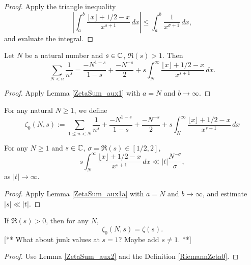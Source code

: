\begin{proof}
Apply the triangle inequality
$$
\left|\int_a^b \frac{\lfloor x\rfloor + 1/2 - x}{x^{s+1}} \, dx\right|
\le \int_a^b \frac{1}{x^{\sigma+1}} \, dx,
$$
and evaluate the integral.
\end{proof}


\begin{lemma}\label{ZetaSum_aux2}\leanok
  Let $N$ be a natural number and $s\in \C$, $\Re(s)>1$.
  Then
  \[
  \sum_{N < n} \frac{1}{n^s} =  \frac{- N^{1-s}}{1-s} + \frac{-N^{-s}}{2} + s \int_N^\infty \frac{\lfloor x\rfloor + 1/2 - x}{x^{s+1}} \, dx.
  \]
\end{lemma}


\begin{proof}
  Apply Lemma \ref{ZetaSum_aux1} with $a=N$ and $b\to \infty$.
\end{proof}


\begin{definition}[RiemannZeta0]\label{RiemannZeta0}\leanok
{}
For any natural $N\ge1$, we define
$$
\zeta_0(N,s) :=
\sum_{1\le n < N} \frac1{n^s}
+
\frac{- N^{1-s}}{1-s} + \frac{-N^{-s}}{2} + s \int_N^\infty \frac{\lfloor x\rfloor + 1/2 - x}{x^{s+1}} \, dx
$$
\end{definition}


\begin{lemma}[ZetaBndAux]\label{ZetaBndAux}\leanok
For any $N\ge1$ and $s\in \C$, $\sigma=\Re(s)\in[1/2,2]$,
$$
s\int_N^\infty \frac{\lfloor x\rfloor + 1/2 - x}{x^{s+1}} \, dx
\ll |t| \frac{N^{-\sigma}}{\sigma},
$$
as $|t|\to\infty$.
\end{lemma}


\begin{proof}
Apply Lemma \ref{ZetaSum_aux1a} with $a=N$ and $b\to \infty$, and estimate $|s|\ll |t|$.
\end{proof}


\begin{lemma}\label{Zeta0EqZeta}\leanok
If $\Re(s)>0$, then for any $N$,
$$
\zeta_0(N,s) = \zeta(s).
$$
[** What about junk values at $s=1$? Maybe add $s\ne1$. **]
\end{lemma}


\begin{proof}
Use Lemma \ref{ZetaSum_aux2} and the Definition \ref{RiemannZeta0}.
\end{proof}


